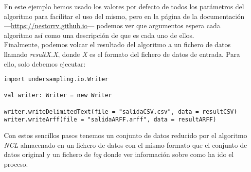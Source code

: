 En este ejemplo hemos usado los valores por defecto de todos los parámetros del algoritmo para facilitar el uso del mismo, pero en la página de la documentación —\href{https://nestorrv.github.io}{https://nestorrv.github.io}— podemos ver que argumentos espera cada algoritmo así como una descripción de que es cada uno de ellos. \\

Finalmente, podemos volcar el resultado del algoritmo a un fichero de datos llamado \textit{resultX.X}, donde \textit{X} es el formato del fichero de datos de entrada. Para ello, solo debemos ejecutar:

\begin{lstlisting}[frame=single, basicstyle=\scriptsize, breaklines=true]
import undersampling.io.Writer

val writer: Writer = new Writer

writer.writeDelimitedText(file = "salidaCSV.csv", data = resultCSV)
writer.writeArff(file = "salidaARFF.arff", data = resultARFF)
\end{lstlisting}

Con estos sencillos pasos tenemos un conjunto de datos reducido por el algoritmo \textit{NCL} almacenado en un fichero de datos con el mismo formato que el conjunto de datos original y un fichero de \textit{log} donde ver información sobre como ha ido el proceso.